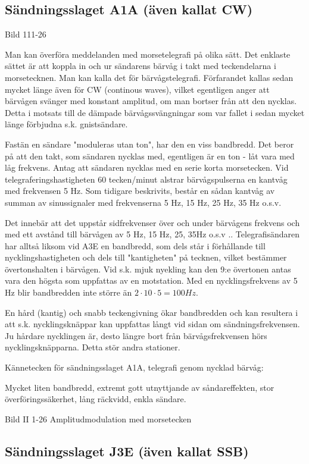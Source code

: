 \subsection{Sändningsslaget A1A (även kallat CW)}

Bild 111-26

Man kan överföra meddelanden med morsetelegrafi på olika sätt. Det enklaste sättet är att
koppla in och ur sändarens bärvåg i takt med teckendelarna i morsetecknen. Man kan kalla
det för bärvågstelegrafi. Förfarandet kallas sedan mycket länge även för CW (continous
waves), vilket egentligen anger att bärvågen svänger med konstant amplitud, om man bortser
från att den nycklas. Detta i motsats till de dämpade bärvågssvängningar som var fallet i
sedan mycket länge förbjudna s.k. gnistsändare.

Fastän en sändare "moduleras utan ton", har den en viss bandbredd. Det beror på att den
takt, som sändaren nycklas med, egentligen är en ton - låt vara med låg frekvens. Antag
att sändaren nycklas med en serie korta morsetecken. Vid telegraferingshastigheten
60 tecken/minut alstrar bärvågspulserna en kantvåg med frekvensen 5 Hz. Som tidigare
beskrivits, består en sådan kantvåg av summan av sinussignaler med frekvenserna 5 Hz,
15 Hz, 25 Hz, 35 Hz o.s.v.

Det innebär att det uppstår sidfrekvenser över och under bärvågens frekvens och med
ett avstånd till bärvågen av 5 Hz, 15 Hz, 25, 35Hz o.s.v .. Telegrafisändaren har alltså
liksom vid A3E en bandbredd, som dels står i förhållande till nycklingshastigheten och
dels till "kantigheten" på tecknen, vilket bestämmer övertonshalten i bärvågen. Vid s.k.
mjuk nyekling kan den 9:e övertonen antas vara den högsta som uppfattas av en motstation.
Med en nycklingsfrekvens av 5 Hz blir bandbredden inte större än
\(2 \cdot 10 \cdot 5 = 100Hz\).

En hård (kantig) och snabb teckengivning ökar bandbredden och kan resultera i att s.k.
nycklingsknäppar kan uppfattas långt vid sidan om sändningsfrekvensen. Ju hårdare
nycklingen är, desto längre bort från bärvågsfrekvensen hörs nycklingsknäpparna. Detta
stör andra stationer.

Kännetecken för sändningsslaget A1A, telegrafi genom nycklad bärvåg:

Mycket liten bandbredd, extremt gott utnyttjande av såndareffekten, stor
överföringssäkerhet, lång räckvidd, enkla sändare.

Bild II 1-26 Amplitudmodulation med morsetecken

\subsection{Sändningsslaget J3E (även kallat SSB)}

